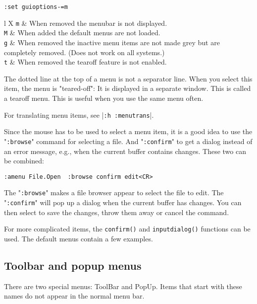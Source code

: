 \begin{Verbatim}[samepage=true]
 :set guioptions-=m
\end{Verbatim}
 
\begin{center} \begin{tabularx}{l X}
				\verb!m! & When removed the menubar is not displayed. \\
				\verb!M! & When added the default menus are not loaded. \\
				\verb!g! & When removed the inactive menu items are not made grey but are completely removed.  (Does not work on all systems.) \\
				\verb!t! & When removed the tearoff feature is not enabled. \\
\end{tabularx} \end{center}

The dotted line at the top of a menu is not a separator line.
When you select this item, the menu is "teared-off": It is displayed in a separate window.
This is called a tearoff menu.
This is useful when you use the same menu often.

For translating menu items, see |\verb!:h :menutrans!|.

Since the mouse has to be used to select a menu item, it is a good idea to use the "\verb!:browse!" command for selecting a file.
And "\verb!:confirm!" to get a dialog instead of an error message, e.g., when the current buffer contains changes.
These two can be combined:

\begin{Verbatim}[samepage=true]
 :amenu File.Open  :browse confirm edit<CR>
\end{Verbatim}

The "\verb!:browse!" makes a file browser appear to select the file to edit.
The "\verb!:confirm!" will pop up a dialog when the current buffer has changes.
You can then select to save the changes, throw them away or cancel the command.

For more complicated items, the \verb!confirm()! and \verb!inputdialog()! functions can be used.
The default menus contain a few examples.
\subsection{Toolbar and popup menus}
There are two special menus: ToolBar and PopUp.
Items that start with these names do not appear in the normal menu bar.

